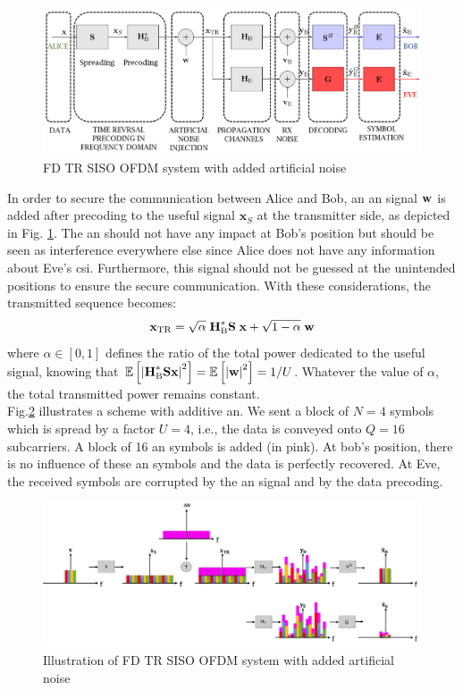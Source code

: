 \begin{figure}[htb!]
    \centering
    \includegraphics[width=1\linewidth]{img/Capture2.PNG}
    \caption{FD TR SISO OFDM system with added artificial noise}
    \label{fig:TR_FD_AN}
\end{figure} 
In order to secure the communication between Alice and Bob, an \gls{an} signal $\textbf{w}$ is added after precoding to the useful signal $\textbf{x}_S$ at the transmitter side, as depicted in Fig. \ref{fig:TR_FD_AN}. The \gls{an} should not have any impact at Bob's position but should be seen as interference everywhere else since Alice does not have any information about Eve's \gls{csi}. Furthermore, this signal should not be guessed at the unintended positions to ensure the secure communication. With these considerations, the transmitted sequence becomes:
\begin{equation}
    \textbf{x}_{\text{TR}} = \sqrt{\alpha} \;\textbf{H}_{\text{B}}^*  \textbf{S}\; \textbf{x} +  \sqrt{1-\alpha} \; \textbf{w}
    \label{eq:sym_rad_AN}
\end{equation} 
where $\alpha \in [0,1]$ defines the ratio of the total power dedicated to the useful signal, knowing that $\mathbb{E} \left[\left|\textbf{H}_{\text{B}}^*\textbf{S}\textbf{x}\right|^2\right] = \mathbb{E} \left[\left|\textbf{w}\right|^2\right] = 1/U$. Whatever the value of $\alpha$, the total transmitted power remains constant.\\

Fig.\ref{fig:AN_illustration} illustrates a scheme with additive \gls{an}. We sent a block of $N=4$ symbols which is spread by a factor $U=4$, i.e., the data is conveyed onto $Q=16$ subcarriers. A block of 16 \gls{an} symbols is added (in pink). At bob's position, there is no influence of these \gls{an} symbols and the data is perfectly recovered. At Eve, the received symbols are corrupted by the \gls{an} signal and by the data precoding.
\begin{figure}[h!]
    \centering
    \includegraphics[width=1\linewidth]{img/scheme_AN_illustration.png}
    \caption{Illustration of FD TR SISO OFDM system with added artificial noise}
    \label{fig:AN_illustration}
\end{figure} 

